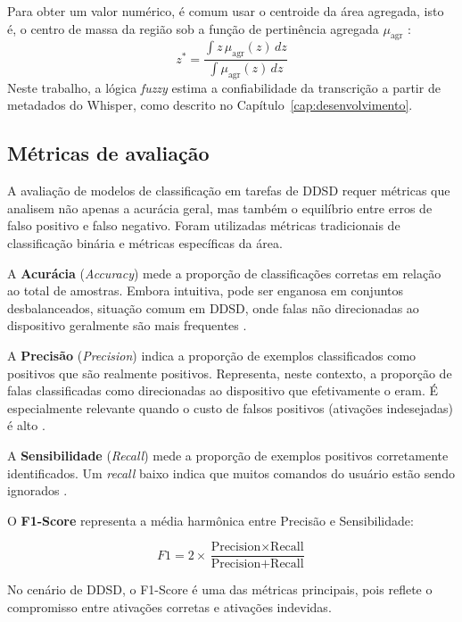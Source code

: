 \documentclass[
    12pt,                %
    openright,           %
    oneside,             %
    a4paper,             %
    english,             %
    brazil               %
]{abntex2}
\begin{document}
Para obter um valor numérico, é comum usar o centroide da área agregada, isto é, o centro de massa da região sob a função de pertinência agregada $\mu_{\text{agr}}$ \cite{Lee1990}:
\[
z^{*} = \frac{\int z\,\mu_{\text{agr}}(z)\,dz}{\int \mu_{\text{agr}}(z)\,dz}
\]
Neste trabalho, a lógica \textit{fuzzy} estima a confiabilidade da transcrição a partir de metadados do Whisper, como descrito no Capítulo~\ref{cap:desenvolvimento}.


\subsection{Métricas de avaliação}
\label{sec:metricas}

A avaliação de modelos de classificação em tarefas de DDSD requer métricas que analisem não apenas a acurácia geral, mas também o equilíbrio entre erros de falso positivo e falso negativo. Foram utilizadas métricas tradicionais de classificação binária e métricas específicas da área.

A \textbf{Acurácia} (\textit{Accuracy}) mede a proporção de classificações corretas em relação ao total de amostras. Embora intuitiva, pode ser enganosa em conjuntos desbalanceados, situação comum em DDSD, onde falas não direcionadas ao dispositivo geralmente são mais frequentes \cite{Manning2008}.

A \textbf{Precisão} (\textit{Precision}) indica a proporção de exemplos classificados como positivos que são realmente positivos. Representa, neste contexto, a proporção de falas classificadas como direcionadas ao dispositivo que efetivamente o eram. É especialmente relevante quando o custo de falsos positivos (ativações indesejadas) é alto \cite{Manning2008}.

A \textbf{Sensibilidade} (\textit{Recall}) mede a proporção de exemplos positivos corretamente identificados. Um \textit{recall} baixo indica que muitos comandos do usuário estão sendo ignorados \cite{Manning2008}.

O \textbf{F1-Score} representa a média harmônica entre Precisão e Sensibilidade:

\[
F1 = 2 \times \frac{\text{Precision} \times \text{Recall}}{\text{Precision} + \text{Recall}}
\]

No cenário de DDSD, o F1-Score é uma das métricas principais, pois reflete o compromisso entre ativações corretas e ativações indevidas.
\end{document}
